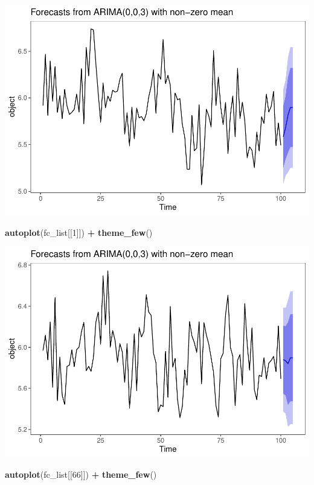 \documentclass[11pt, a4paper]{report}
\newenvironment{Shaded}{\begin{snugshade}}{\end{snugshade}}
\newcommand{\DecValTok}[1]{\textcolor[rgb]{0.00,0.00,0.81}{#1}}
\newcommand{\KeywordTok}[1]{\textcolor[rgb]{0.13,0.29,0.53}{\textbf{#1}}}
\newcommand{\NormalTok}[1]{#1}
\newcommand{\OperatorTok}[1]{\textcolor[rgb]{0.81,0.36,0.00}{\textbf{#1}}}
\newcommand{\StringTok}[1]{\textcolor[rgb]{0.31,0.60,0.02}{#1}}
\theoremstyle{plain}
\theoremstyle{plain}
\theoremstyle{remark}
\begin{document}
\begin{center}\includegraphics{Econo2_P4_files/figure-latex/forecast arima plots-1} \end{center}

\begin{Shaded}
	\begin{Highlighting}[]
		\KeywordTok{autoplot}\NormalTok{(fc_list[[}\DecValTok{1}\NormalTok{]]) }\OperatorTok{+}\StringTok{ }\KeywordTok{theme_few}\NormalTok{()}
	\end{Highlighting}
\end{Shaded}

\begin{center}\includegraphics{Econo2_P4_files/figure-latex/forecast arima plots-2} \end{center}

\begin{Shaded}
	\begin{Highlighting}[]
		\KeywordTok{autoplot}\NormalTok{(fc_list[[}\DecValTok{66}\NormalTok{]]) }\OperatorTok{+}\StringTok{ }\KeywordTok{theme_few}\NormalTok{()}
	\end{Highlighting}
\end{Shaded}
\end{document}
